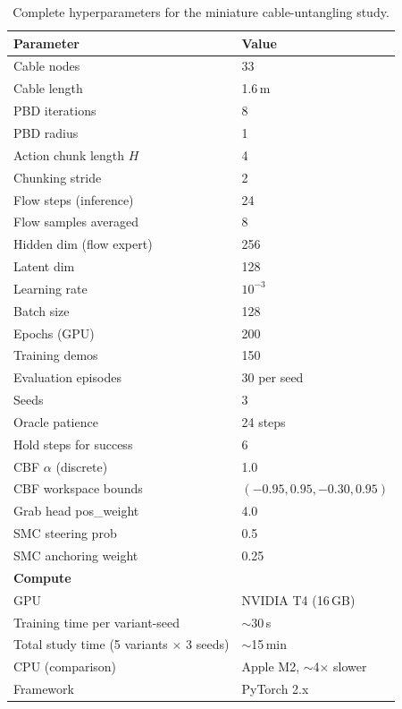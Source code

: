 \documentclass[11pt,a4paper]{article}
\begin{document}
\begin{table}[h]
\centering
\caption{Complete hyperparameters for the miniature cable-untangling study.}
\label{tab:hyper}
\begin{tabular}{@{}ll@{}}
\toprule
Parameter & Value \\
\midrule
Cable nodes & 33 \\
Cable length & 1.6\,m \\
PBD iterations & 8 \\
PBD radius & 1 \\
Action chunk length $H$ & 4 \\
Chunking stride & 2 \\
Flow steps (inference) & 24 \\
Flow samples averaged & 8 \\
Hidden dim (flow expert) & 256 \\
Latent dim & 128 \\
Learning rate & $10^{-3}$ \\
Batch size & 128 \\
Epochs (GPU) & 200 \\
Training demos & 150 \\
Evaluation episodes & 30 per seed \\
Seeds & 3 \\
Oracle patience & 24 steps \\
Hold steps for success & 6 \\
CBF $\alpha$ (discrete) & 1.0 \\
CBF workspace bounds & $(-0.95, 0.95, -0.30, 0.95)$ \\
Grab head pos\_weight & 4.0 \\
SMC steering prob & 0.5 \\
SMC anchoring weight & 0.25 \\
\midrule
\multicolumn{2}{l}{\textbf{Compute}} \\
\midrule
GPU & NVIDIA T4 (16\,GB) \\
Training time per variant-seed & $\sim$30\,s \\
Total study time (5 variants $\times$ 3 seeds) & $\sim$15\,min \\
CPU (comparison) & Apple M2, $\sim$4$\times$ slower \\
Framework & PyTorch 2.x \\
\bottomrule
\end{tabular}
\end{table}
\end{document}
